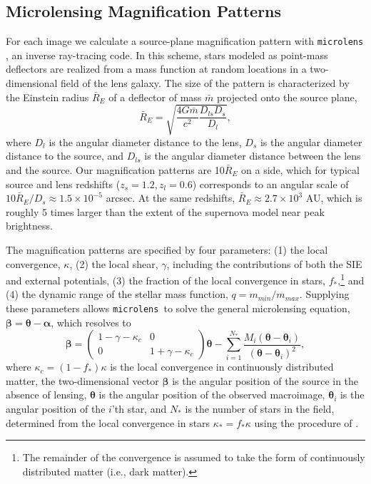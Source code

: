 \documentclass[iop,apj,numberedappendix,twocolappendix]{emulateapj}
\newcommand{\vect}[1]{\ensuremath{\boldsymbol{#1}}}
\begin{document}
\subsection{Microlensing Magnification Patterns}
\label{sec:ml}

For each image we calculate a source-plane magnification pattern with \texttt{microlens} \citep{wthesis,mltree}, an inverse ray-tracing code.
In this scheme, stars modeled as point-mass deflectors are realized from a mass function at random locations in a two-dimensional field of the lens galaxy.
The size of the pattern is characterized by the Einstein radius $\bar{R}_E$ of a deflector of mass $\bar{m}$ projected onto the source plane,
\begin{equation}
\bar{R}_E = \sqrt{\frac{4G\bar{m}}{c^2}\frac{D_{ls}D_s}{D_l}},
\end{equation}
where $D_l$ is the angular diameter distance to the lens, $D_s$ is the angular diameter distance to the source, and $D_{ls}$ is the angular diameter distance between the lens and the source.
Our magnification patterns are 10$\bar{R}_E$ on a side, which for typical source and lens redshifts ($z_s = 1.2, z_l = 0.6$) corresponds to an angular scale of $10\bar{R}_E / D_s \approx 1.5 \times 10^{-5}$ arcsec.
At the same redshifts, $\bar{R}_E \approx 2.7 \times 10^3$ AU, which is roughly 5 times larger than the extent of the supernova model near peak brightness.


The magnification patterns are specified by four parameters:
(1) the local convergence, $\kappa$, 
(2) the local shear, $\gamma$, including the contributions of both the SIE and external potentials,
(3) the fraction of the local convergence in stars, $f_*$,\footnote{The remainder of the convergence is assumed to take the form of continuously distributed matter (i.e., dark matter).} and
(4) the dynamic range of the stellar mass function, $q=m_{min}/m_{max}$.
Supplying these parameters allows \texttt{microlens}\ to solve the general microlensing equation, $\vect{\beta} = \vect{\theta} - \vect{\alpha}$, which resolves to
\begin{equation}
\label{eq:lenseq}
\vect{\beta} =  \begin{pmatrix}
1 - \gamma - \kappa_c & 0 \\
0 & 1 + \gamma - \kappa_c
\end{pmatrix}\vect{\theta} - \sum_{i=1}^{N_*}\frac{M_i (\vect{\theta} - \vect{\theta}_i)}{(\vect{\theta} - \vect{\theta}_i)^2},
\end{equation}
where $\kappa_c=(1-f_*)\kappa$ is the local convergence in continuously distributed matter, the two-dimensional vector $\vect{\beta}$ is the angular position of the source in the absence of lensing, $\vect{\theta}$ is the angular position of the observed macroimage, $\vect{\theta}_i$ is the angular position of the $i$'th star, and $N_*$ is the number of stars in the  field, determined from the local convergence in stars $\kappa_* = f_*\kappa$ using the procedure of \cite{schneiderweiss87}.
\end{document}
